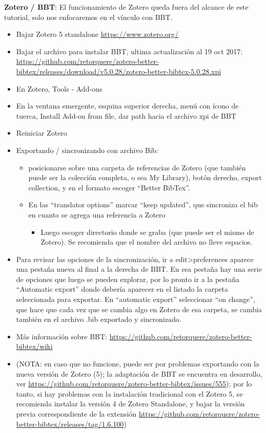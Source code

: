 \documentclass[11pt,]{book}
\providecommand{\tightlist}{%
  \setlength{\itemsep}{0pt}\setlength{\parskip}{0pt}}
\begin{document}
\textbf{Zotero / BBT}: El funcionamiento de Zotero queda fuera del alcance de este tutorial, solo nos enfocaremos en el vínculo con BBT.

\begin{itemize}
\tightlist
\item
  Bajar Zotero 5 standalone \url{https://www.zotero.org/}
\item
  Bajar el archivo para instalar BBT, ultima actualización al 19 oct 2017: \url{https://github.com/retorquere/zotero-better-bibtex/releases/download/v5.0.28/zotero-better-bibtex-5.0.28.xpi}
\item
  En Zotero, Tools - Add-ons
\item
  En la ventana emergente, esquina superior derecha, menú con ícono de tuerca, Install Add-on from file, dar path hacia el archivo xpi de BBT
\item
  Reiniciar Zotero
\item
  Exportando / sincronizando con archivo Bib:

  \begin{itemize}
  \tightlist
  \item
    posicionarse sobre una carpeta de referencias de Zotero (que también puede ser la colección completa, o sea My Library), botón derecho, export collection, y en el formato escoger ``Better BibTex''.
  \item
    En las ``translator options'' marcar ``keep updated'', que sincroniza el bib en cuanto se agrega una referencia a Zotero

    \begin{itemize}
    \tightlist
    \item
      Luego escoger directorio donde se graba (que puede ser el mismo de Zotero). Se recomienda que el nombre del archivo no lleve espacios.
    \end{itemize}
  \end{itemize}
\item
  Para revisar las opciones de la sincronización, ir a edit\textgreater{}preferences aparece una pestaña nueva al final a la derecha de BBT. En esa pestaña hay una serie de opciones que luego se pueden explorar, por lo pronto ir a la pestaña ``Automatic export'' donde debería aparecer en el listado la carpeta seleccionada para exportar. En ``automatic export'' seleccionar ``on change'', que hace que cada vez que se cambia algo en Zotero de esa carpeta, se cambia también en el archivo .bib exportado y sincronizado.
\item
  Más información sobre BBT: \url{https://github.com/retorquere/zotero-better-bibtex/wiki}
\item
  (NOTA: en caso que no funcione, puede ser por problemas exportando con la nueva versión de Zotero (5); la adaptación de BBT se encuentra en desarrollo, ver \url{https://github.com/retorquere/zotero-better-bibtex/issues/555}); por lo tanto, si hay problemas con la instalación tradicional con el Zotero 5, se recomienda instalar la versión 4 de Zotero Standalone, y bajar la versión previa correspondiente de la extensión \url{https://github.com/retorquere/zotero-better-bibtex/releases/tag/1.6.100})
\end{itemize}
\end{document}
